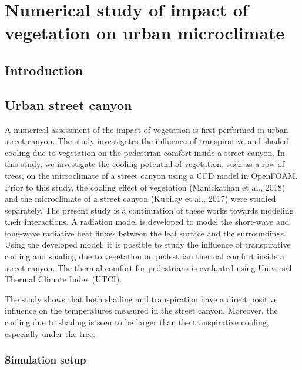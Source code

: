 \chapter{Numerical study of impact of vegetation on urban microclimate}
\label{ch:impactofvegetation}

%		

\section{Introduction}

\section{Urban street canyon}

A numerical assessment of the impact of vegetation is first performed in urban street-canyon. The study investigates the influence of transpirative and shaded cooling due to vegetation on the pedestrian comfort inside a street canyon. In this study, we investigate the cooling potential of vegetation, such as a row of trees, on the microclimate of a street canyon using a CFD model in OpenFOAM. Prior to this study, the cooling effect of vegetation (Manickathan et al., 2018) and the microclimate of a street canyon (Kubilay et al., 2017) were studied separately. The present study is a continuation of these works towards modeling their interactions. A radiation model is developed to model the short-wave and long-wave radiative heat fluxes between the leaf surface and the surroundings. Using the developed model, it is possible to study the influence of transpirative cooling and shading due to vegetation on pedestrian thermal comfort inside a street canyon. The thermal comfort for pedestrians is evaluated using Universal Thermal Climate Index (UTCI). 

The study shows that both shading and transpiration have a direct positive influence on the temperatures measured in the street canyon. Moreover, the cooling due to shading is seen to be larger than the transpirative cooling, especially under the tree.

\subsection{Simulation setup}

